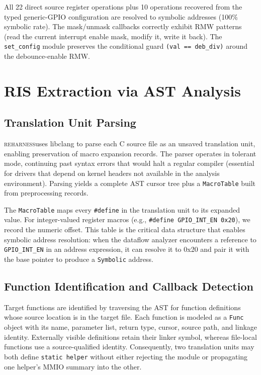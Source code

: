 \documentclass[sigplan, screen, review, anonymous]{acmart}
\newcommand{\reharness}{\textsc{reharness}}
\begin{document}
All 22 direct source register operations plus 10 operations recovered from the typed generic-GPIO configuration are resolved to symbolic addresses (100\% symbolic rate). The mask/unmask callbacks correctly exhibit RMW patterns (read the current interrupt enable mask, modify it, write it back). The \texttt{set\_config} module preserves the conditional guard \texttt{(val == deb\_div)} around the debounce-enable RMW.

\section{RIS Extraction via AST Analysis}

\subsection{Translation Unit Parsing}

\reharness uses libclang to parse each C source file as an unsaved translation unit, enabling preservation of macro expansion records. The parser operates in tolerant mode, continuing past syntax errors that would halt a regular compiler (essential for drivers that depend on kernel headers not available in the analysis environment). Parsing yields a complete AST cursor tree plus a \texttt{MacroTable} built from preprocessing records.

The \texttt{MacroTable} maps every \texttt{\#define} in the translation unit to its expanded value. For integer-valued register macros (e.g., \texttt{\#define GPIO\_INT\_EN 0x20}), we record the numeric offset. This table is the critical data structure that enables symbolic address resolution: when the dataflow analyzer encounters a reference to \texttt{GPIO\_INT\_EN} in an address expression, it can resolve it to 0x20 and pair it with the base pointer to produce a \texttt{Symbolic} address.

\subsection{Function Identification and Callback Detection}

Target functions are identified by traversing the AST for function definitions whose source location is in the target file. Each function is modeled as a \texttt{Func} object with its name, parameter list, return type, cursor, source path, and linkage identity. Externally visible definitions retain their linker symbol, whereas file-local functions use a source-qualified identity. Consequently, two translation units may both define \texttt{static helper} without either rejecting the module or propagating one helper's MMIO summary into the other.
\end{document}
